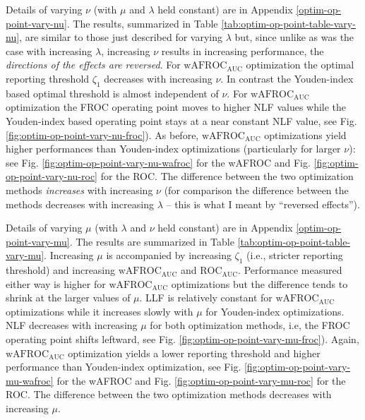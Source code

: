\documentclass[
]{book}
\begin{document}
Details of varying \(\nu\) (with \(\mu\) and \(\lambda\) held constant) are in Appendix \ref{optim-op-point-vary-nu}. The results, summarized in Table \ref{tab:optim-op-point-table-vary-nu}, are similar to those just described for varying \(\lambda\) but, since unlike as was the case with increasing \(\lambda\), increasing \(\nu\) results in increasing performance, the \emph{directions of the effects are reversed}. For \(\text{wAFROC}_\text{AUC}\) optimization the optimal reporting threshold \(\zeta_1\) decreases with increasing \(\nu\). In contrast the Youden-index based optimal threshold is almost independent of \(\nu\). For \(\text{wAFROC}_\text{AUC}\) optimization the FROC operating point moves to higher NLF values while the Youden-index based operating point stays at a near constant NLF value, see Fig. \ref{fig:optim-op-point-vary-nu-froc}). As before, \(\text{wAFROC}_\text{AUC}\) optimizations yield higher performances than Youden-index optimizations (particularly for larger \(\nu\)): see Fig. \ref{fig:optim-op-point-vary-nu-wafroc} for the wAFROC and Fig. \ref{fig:optim-op-point-vary-nu-roc} for the ROC. The difference between the two optimization methods \emph{increases} with increasing \(\nu\) (for comparison the difference between the methods decreases with increasing \(\lambda\) -- this is what I meant by ``reversed effects'').

Details of varying \(\mu\) (with \(\lambda\) and \(\nu\) held constant) are in Appendix \ref{optim-op-point-vary-mu}. The results are summarized in Table \ref{tab:optim-op-point-table-vary-mu}. Increasing \(\mu\) is accompanied by increasing \(\zeta_1\) (i.e., stricter reporting threshold) and increasing \(\text{wAFROC}_\text{AUC}\) and \(\text{ROC}_\text{AUC}\). Performance measured either way is higher for \(\text{wAFROC}_\text{AUC}\) optimizations but the difference tends to shrink at the larger values of \(\mu\). LLF is relatively constant for \(\text{wAFROC}_\text{AUC}\) optimizations while it increases slowly with \(\mu\) for Youden-index optimizations. NLF decreases with increasing \(\mu\) for both optimization methods, i.e, the FROC operating point shifts leftward, see Fig. \ref{fig:optim-op-point-vary-mu-froc}). Again, \(\text{wAFROC}_\text{AUC}\) optimization yields a lower reporting threshold and higher performance than Youden-index optimization, see Fig. \ref{fig:optim-op-point-vary-mu-wafroc} for the wAFROC and Fig. \ref{fig:optim-op-point-vary-mu-roc} for the ROC. The difference between the two optimization methods decreases with increasing \(\mu\).
\end{document}
